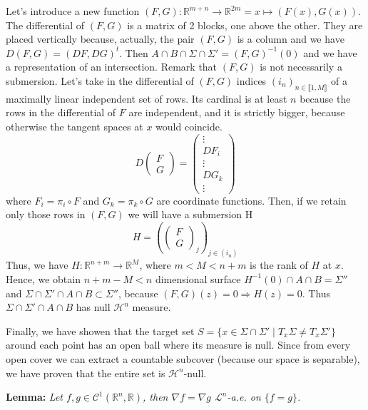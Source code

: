 \vspace{1ex}
Let's introduce a new function $(F, G):\mathbb R^{m+n}\rightarrow\mathbb R^{2m}
=x\mapsto (F(x),G(x))$. The differential of $(F,G)$ is a matrix of 2 blocks, one
above the other. They are placed vertically because, actually, the pair $(F,G)$ is
a column and we have $D(F,G)=(DF,DG)^t$. Then $A\cap B\cap\Sigma\cap\Sigma'=(F,G)
^{-1}(0)$ and we have a representation of an intersection. Remark
that $(F, G)$ is not necessarily a submersion. Let's take in the differential of $(F
,G)$ indices $(i_n)_{n\in\llbracket1,M\rrbracket}$ of a maximally linear
independent set of rows. Its cardinal is at least $n$ because the rows in the
differential of $F$ are independent, and it is strictly bigger, because otherwise
the tangent spaces at $x$ would coincide.
\[D\left(\begin{array}{cc} F\\ G\end{array}\right) =
    \left(\begin{array}{cc} \vdots \\DF_i\\ \vdots\\ DG_k\\ \vdots\end{array}\right)\]
where $F_i=\pi_i\circ F$ and $G_k=\pi_k\circ G$ are coordinate functions. Then,
if we retain only those rows in $(F,G)$ we will have a submersion H
\[H=\left(\left(\begin{array}{cc} F\\ G\end{array}\right)_j\right)_{j\in(i_n)}\]
Thus, we have $H:\mathbb R^{n+m}\rightarrow\mathbb R^{M}$, where $m<M<n+m$ is the
rank of $H$ at $x$. Hence, we obtain $n+m-M<n$ dimensional surface $H^{-1}(0)\cap
A\cap B=\Sigma''$ and $\Sigma\cap\Sigma'\cap A\cap B\subset\Sigma''$, because
$(F,G)(z)=0\Rightarrow H(z)=0$. Thus $\Sigma\cap\Sigma'\cap A\cap B$ has null
$\mathcal H^n$ measure.

\vspace{1ex}
Finally, we have showen that the target set $S=\{x\in\Sigma\cap\Sigma'\;|\;T_x\Sigma
\neq T_x\Sigma'\}$ around each point has an open ball where its measure is null.
Since from every open cover we can extract a countable subcover (because our
space is separable), we have proven that the entire set is $\mathcal H^n$-null.

\vspace{2ex}
\textbf{Lemma:} \textit{Let $f,g\in\mathcal C^1(\mathbb R^n, \mathbb R)$, then $\nabla f
=\nabla g$ $\mathcal L^n$-a.e. on $\{f=g\}$.}

